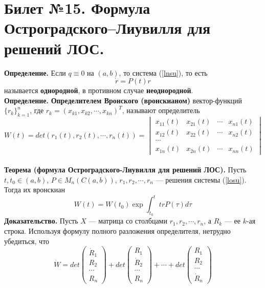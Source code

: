 \documentclass{article}
\begin{document}
\section{Билет №15. Формула Остроградского–Лиувилля для решений ЛОС.}
\textbf{Определение.} Если $q \equiv 0$ на $(a,b)$, то система (\ref{lnsu}), то есть
\begin{equation}
    \dot{r} = P(t)r \label{losu}
\end{equation}
называется \textbf{однородной}, в противном случае \textbf{неоднородной}.\\

\noindent \textbf{Определение.} \textbf{Определителем Вронского (вронскианом)} вектор-функций $\{r_k\}_{k=1}^n$, где $r_k=(x_{k1}, x_{k2}, \cdots, x_{kn})^T$, называют определитель
\begin{equation*}
    W(t) = det(r_1(t),r_2(t),\cdots, r_n(t)) = \begin{vmatrix}
    x_{11}(t) & x_{21}(t) & \cdots & x_{n1}(t)\\
    x_{12}(t) & x_{22}(t) & \cdots & x_{n2}(t)\\
    \cdots\\
    x_{1n}(t) & x_{2n}(t) & \cdots & x_{nn}(t)
    \end{vmatrix}
\end{equation*}
\\
\noindent \textbf{Теорема (формула Остроградского-Лиувилля для решений ЛОС).} Пусть $t, t_0 \in (a,b)$, $P \in M_n(C(a,b))$, $r_1, r_2, \cdots, r_n$ --- решения системы (\ref{losu}). Тогда их вронскиан
\begin{equation*}
    W(t) = W(t_0)\exp \int_{t_0}^t trP(\tau)d\tau
\end{equation*}
\textbf{Доказательство.} Пусть $X$ --- матрица со столбцами $r_1, r_2, \cdots, r_n$, а $R_k$ --- ее $k$-ая строка. Используя формулу полного разложения определителя, нетрудно убедиться, что
\begin{equation*}
    \dot{W} = det\begin{pmatrix}
    \dot{R}_1\\
    R_2\\
    \cdots\\
    R_n
    \end{pmatrix} + det\begin{pmatrix}
    R_1\\
    \dot{R}_2\\
    \cdots\\
    R_n
    \end{pmatrix} + \cdots + det\begin{pmatrix}
    R_1\\
    R_2\\
    \cdots\\
    \dot{R}_n
    \end{pmatrix}
\end{equation*}
\end{document}
